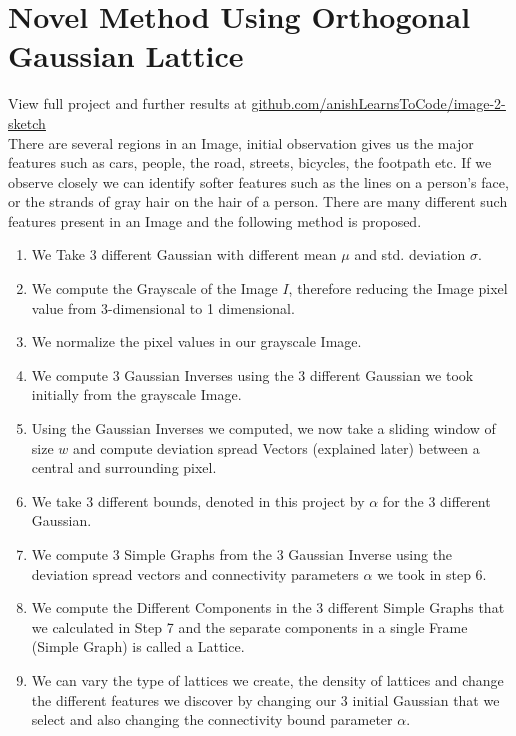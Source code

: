 \documentclass{article}
\begin{document}
\clearpage
\section{Novel Method Using Orthogonal Gaussian Lattice}
View full project and further results at \underline{\href{https://github.com/anishLearnsToCode/image2sketch}{github.com/anishLearnsToCode/image-2-sketch}} \\

There are several regions in an Image, initial observation gives us the major features such as cars, 
people, the road, streets, bicycles, the footpath etc. If we observe closely we can identify softer 
features such as the lines on a person's face, or the strands of gray hair on the hair of a person. There 
are many different such features present in an Image and the following method is proposed.

\begin{enumerate}
    \item We Take 3 different Gaussian with different mean $\mu$ and std. deviation $\sigma$.
    \item We compute the Grayscale of the Image $I$, therefore reducing the Image pixel value from 3-dimensional to 1 dimensional.
    \item We normalize the pixel values in our grayscale Image.
    \item We compute 3 Gaussian Inverses using the 3 different Gaussian we took initially from the grayscale Image.
    \item Using the Gaussian Inverses we computed, we now take a sliding window of size $w$ and compute deviation spread Vectors (explained later) between a central and surrounding pixel.
    \item We take 3 different bounds, denoted in this project by $\alpha$ for the 3 different Gaussian.
    \item We compute 3 Simple Graphs from the 3 Gaussian Inverse using the deviation spread vectors and connectivity parameters $\alpha$ we took in step 6.
    \item We compute the Different Components in the 3 different Simple Graphs that we calculated in Step 7 and the separate components in a single Frame (Simple Graph) is called a Lattice.
    \item We can vary the type of lattices we create, the density of lattices and change the different features we discover by changing our 3 initial Gaussian that we select and also changing the connectivity bound parameter $\alpha$.
\end{enumerate}
\end{document}
